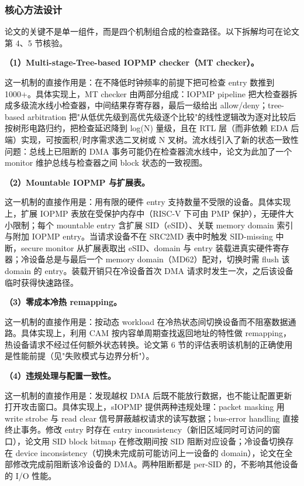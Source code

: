 \documentclass[11pt]{ctexart}
\begin{document}
\subsubsection{核心方法设计}
论文的关键不是单一组件，而是四个机制组合成的检查路径。以下拆解均可在论文第 4、5 节核验。\par
\noindent\textbf{（1）Multi-stage-Tree-based IOPMP checker（MT checker）。}\par
这一机制的直接作用是：在不降低时钟频率的前提下把可检查 entry 数推到 1000+。具体实现上，MT checker 由两部分组成：IOPMP pipeline 把大检查器拆成多级流水线小检查器，中间结果存寄存器，最后一级给出 allow/deny；tree-based arbitration 把"从低优先级到高优先级逐个比较"的线性逻辑改为逐对比较后按树形电路归约，把检查延迟降到 log(N) 量级，且在 RTL 层（而非依赖 EDA 后端）实现，可按面积/时序需求选二叉树或 N 叉树。流水线引入了新的状态一致性问题：总线上已阻断的 DMA 事务可能仍在检查器流水线中，论文为此加了一个 monitor 维护总线与检查器之间 block 状态的一致视图。\par
\noindent\textbf{（2）Mountable IOPMP 与扩展表。}\par
这一机制的直接作用是：用有限的硬件 entry 支持数量不受限的设备。具体实现上，扩展 IOPMP 表放在受保护内存中（RISC-V 下可由 PMP 保护），无硬件大小限制；每个 mountable entry 含扩展 SID（eSID）、关联 memory domain 索引与附加 IOPMP entry。当请求设备不在 SRC2MD 表中时触发 SID-missing 中断，secure monitor 从扩展表取出 eSID、domain 与 entry 装载进真实硬件寄存器；冷设备总是与最后一个 memory domain（MD62）配对，切换时需 flush 该 domain 的 entry。装载开销只在冷设备首次 DMA 请求时发生一次，之后该设备临时获得快速路径。\par
\noindent\textbf{（3）零成本冷热 remapping。}\par
这一机制的直接作用是：按动态 workload 在冷热状态间切换设备而不阻塞数据通路。具体实现上，利用 CAM 按内容单周期查找返回地址的特性做 remapping，热设备请求不经过任何额外状态转换。论文第 6 节的评估表明该机制的正确使用是性能前提（见"失败模式与边界分析"）。\par
\noindent\textbf{（4）违规处理与配置一致性。}\par
这一机制的直接作用是：发现越权 DMA 后既不能放行数据，也不能让配置更新打开攻击窗口。具体实现上，sIOPMP 提供两种违规处理：packet masking 用 write strobe 与 read clear 信号屏蔽越权请求的读写数据；bus-error handling 直接终止事务。修改 entry 时存在 entry inconsistency（新旧区域同时可访问的窗口），论文用 SID block bitmap 在修改期间按 SID 阻断对应设备；冷设备切换存在 device inconsistency（切换未完成前可能访问上一设备的 domain），论文在全部修改完成前阻断该冷设备的 DMA。两种阻断都是 per-SID 的，不影响其他设备的 I/O 性能。\par
\end{document}

